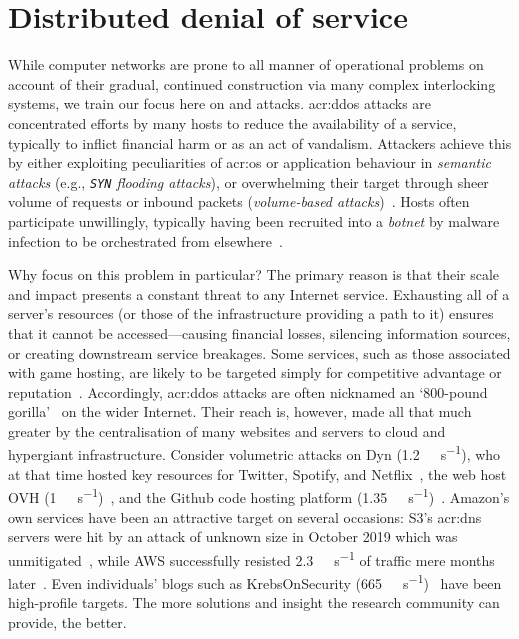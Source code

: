 \section{Distributed denial of service}\label{sec:problems-in-modern-networks}
While computer networks are prone to all manner of operational problems on account of their gradual, continued construction via many complex interlocking systems, we train our focus here on  and  attacks.
\gls{acr:ddos} attacks are concentrated efforts by many hosts to reduce the availability of a service, typically to inflict financial harm or as an act of vandalism.
Attackers achieve this by either exploiting peculiarities of \gls{acr:os} or application behaviour in \emph{semantic attacks} (e.g., \emph{\texttt{SYN} flooding attacks}), or overwhelming their target through sheer volume of requests or inbound packets (\emph{volume-based attacks})~\parencite{DBLP:conf/imc/JonkerKKRSD17}.
Hosts often participate unwillingly, typically having been recruited into a \emph{botnet} by malware infection to be orchestrated from elsewhere~\parencite{DBLP:conf/uss/AntonakakisABBB17}.

Why focus on this problem in particular?
The primary reason is that their scale and impact presents a constant threat to any Internet service.
Exhausting all of a server's resources (or those of the infrastructure providing a path to it) ensures that it cannot be accessed---causing financial losses, silencing information sources, or creating downstream service breakages.
Some services, such as those associated with game hosting, are likely to be targeted simply for competitive advantage or reputation~\parencite{aws-shield-review-2020}.
Accordingly, \gls{acr:ddos} attacks are often nicknamed an `800-pound gorilla'~\parencite{DBLP:conf/imc/CzyzKGPBK14} on the wider Internet.
Their reach is, however, made all that much greater by the centralisation of many websites and servers to cloud and hypergiant infrastructure.
Consider volumetric attacks on Dyn (\qty{1.2}{\tera\bit\per\second}), who at that time hosted key resources for Twitter, Spotify, and Netflix~\parencite{dyn-ddos-2016}, the web host OVH (\qty{1}{\tera\bit\per\second})~\parencite{ovh-ddos-2016}, and the Github code hosting platform (\qty{1.35}{\tera\bit\per\second})~\parencite{github-ddos-2018}.
Amazon's own services have been an attractive target on several occasions: S3's \gls{acr:dns} servers were hit by an attack of unknown size in October 2019 which was unmitigated~\parencite{amazon-s3-2019-ddos}, while AWS successfully resisted \qty{2.3}{\tera\bit\per\second} of traffic mere months later~\parencite{aws-shield-2020-q1}.
Even individuals' blogs such as KrebsOnSecurity (\qty{665}{\giga\bit\per\second})~\parencite{krebs-ddos-2016} have been high-profile targets.
The more solutions and insight the research community can provide, the better.


